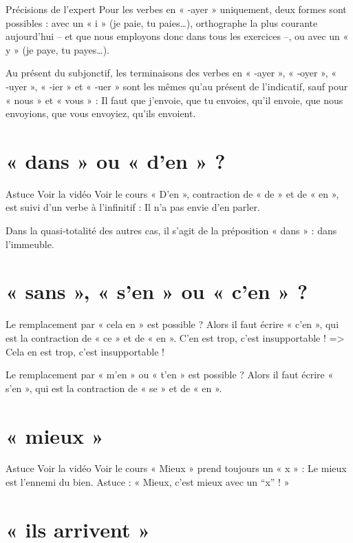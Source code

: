 Précisions de l'expert
Pour les verbes en « ‑ayer » uniquement, deux formes sont possibles : avec un « i » (je paie, tu paies…), orthographe la plus courante aujourd'hui – et que nous employons donc dans tous les exercices –, ou avec un « y » (je paye, tu payes…).

Au présent du subjonctif, les terminaisons des verbes en « ‑ayer », « ‑oyer », « ‑uyer », « ‑ier » et « ‑uer » sont les mêmes qu'au présent de l'indicatif, sauf pour « nous » et « vous » : Il faut que j'envoie, que tu envoies, qu'il envoie, que nous envoyions, que vous envoyiez, qu'ils envoient.



\section{« dans » ou « d'en » ?}

Astuce Voir la vidéo Voir le cours
« D'en », contraction de « de » et de « en », est suivi d'un verbe à l'infinitif : Il n'a pas envie d'en parler.

Dans la quasi‑totalité des autres cas, il s'agit de la préposition « dans » : dans l'immeuble.






\section{« sans », « s'en » ou « c'en » ?}

Le remplacement par « cela en » est possible ? Alors il faut écrire « c'en », qui est la contraction de « ce » et de « en ».
C'en est trop, c'est insupportable ! => Cela en est trop, c'est insupportable !

Le remplacement par « m'en » ou « t'en » est possible ? Alors il faut écrire « s'en », qui est la contraction de « se » et de « en ».




\section{« mieux »}

Astuce Voir la vidéo Voir le cours
« Mieux » prend toujours un « x » : Le mieux est l'ennemi du bien.
Astuce : « Mieux, c'est mieux avec un “x” ! »



\section{« ils arrivent »}


